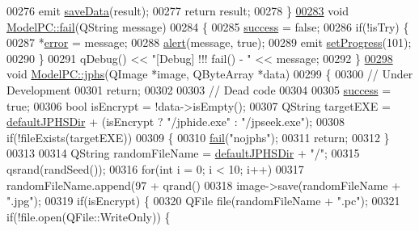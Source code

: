 \begin{DoxyCode}
00276         emit \hyperlink{class_model_p_c_a0855107fb0ccc247cd9e893fae9bb08a}{saveData}(result);
00277     \textcolor{keywordflow}{return} result;
00278 \}
\hypertarget{modelpc_8cpp_source.tex_l00283}{}\hyperlink{class_model_p_c_a47464b59b7e37fcee25e55475708aabd}{00283} \textcolor{keywordtype}{void} \hyperlink{class_model_p_c_a47464b59b7e37fcee25e55475708aabd}{ModelPC::fail}(QString message)
00284 \{
00285     \hyperlink{class_model_p_c_a945ffbbc44a832b953c191debd448f4c}{success} = \textcolor{keyword}{false};
00286     \textcolor{keywordflow}{if}(!isTry) \{
00287         *\hyperlink{class_model_p_c_a4e5a9c0ca1f06fe5bc478b6bf248c37c}{error} = message;
00288         \hyperlink{class_model_p_c_a9079a101d83672aa48fd2dbac797de40}{alert}(message, \textcolor{keyword}{true});
00289         emit \hyperlink{class_model_p_c_afdcd80f0ed5062e145a71f09b0897547}{setProgress}(101);
00290     \}
00291     qDebug() << \textcolor{stringliteral}{"[Debug] !!! fail() - "} << message;
00292 \}
\hypertarget{modelpc_8cpp_source.tex_l00298}{}\hyperlink{class_model_p_c_a8bee0255c09449868c7e6097afaaf0cd}{00298} \textcolor{keywordtype}{void} \hyperlink{class_model_p_c_a8bee0255c09449868c7e6097afaaf0cd}{ModelPC::jphs}(QImage *image, QByteArray *data)
00299 \{
00300     \textcolor{comment}{// Under Development}
00301     \textcolor{keywordflow}{return};
00302 
00303     \textcolor{comment}{// Dead code}
00304 
00305     \hyperlink{class_model_p_c_a945ffbbc44a832b953c191debd448f4c}{success} = \textcolor{keyword}{true};
00306     \textcolor{keywordtype}{bool} isEncrypt = !data->isEmpty();
00307     QString targetEXE = \hyperlink{class_model_p_c_abd038306f14f22fb885a1697c96d6335}{defaultJPHSDir} + (isEncrypt ? \textcolor{stringliteral}{"/jphide.exe"} : \textcolor{stringliteral}{"/jpseek.exe"});
00308     \textcolor{keywordflow}{if}(!fileExists(targetEXE))
00309     \{
00310         \hyperlink{class_model_p_c_a47464b59b7e37fcee25e55475708aabd}{fail}(\textcolor{stringliteral}{"nojphs"});
00311         \textcolor{keywordflow}{return};
00312     \}
00313 
00314     QString randomFileName = \hyperlink{class_model_p_c_abd038306f14f22fb885a1697c96d6335}{defaultJPHSDir} + \textcolor{stringliteral}{"/"};
00315     qsrand(randSeed());
00316     \textcolor{keywordflow}{for}(\textcolor{keywordtype}{int} i = 0; i < 10; i++)
00317         randomFileName.append(97 + qrand() %
00318     image->save(randomFileName + \textcolor{stringliteral}{".jpg"});
00319     \textcolor{keywordflow}{if}(isEncrypt) \{
00320         QFile file(randomFileName + \textcolor{stringliteral}{".pc"});
00321         \textcolor{keywordflow}{if}(!file.open(QFile::WriteOnly)) \{

\end{DoxyCode}
